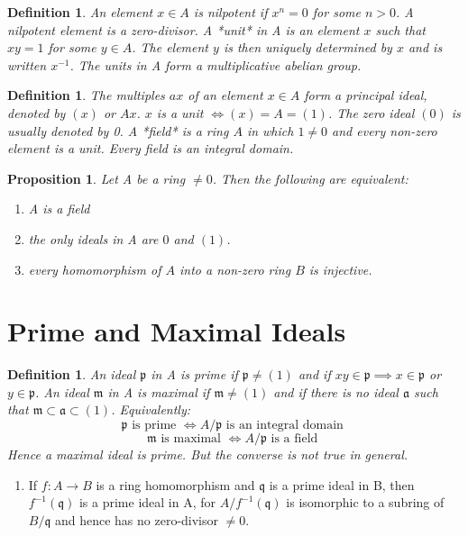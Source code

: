 \documentclass[]{report}
\newtheorem{prop}[theorem]{Proposition}
\newtheorem{defn}[theorem]{Definition}
\begin{document}
\begin{defn}
    An element $x\in A$ is nilpotent if $x^n=0$ for some $n>0$. A nilpotent element is a zero-divisor. A *unit* in A is an element $x$ such that $xy=1$ for some $y\in A$. The element $y$ is then uniquely determined by $x$ and is written $x^{-1}$. The units in A form a multiplicative abelian group.
\end{defn}

\begin{defn}
    The multiples $ax$ of an element $x\in A$ form a principal ideal, denoted by $(x)$ or $Ax$. $x$ is a unit $\Leftrightarrow (x) = A = (1)$. The zero ideal $(0)$ is usually denoted by 0. A *field* is a ring $A$ in which $1\neq 0$ and every non-zero element is a unit. Every field is an integral domain. 
\end{defn}

\begin{prop}
    Let A be a ring $\neq 0$. Then the following are equivalent:
    \begin{enumerate}
        \item A is a field
        \item the only ideals in A are $0$ and $(1)$.
        \item every homomorphism of $A$ into a non-zero ring $B$ is injective.
    \end{enumerate}
\end{prop}

\section{Prime and Maximal Ideals}

\begin{defn}
    An ideal $\mathfrak{p}$ in A is prime if $\mathfrak{p}\neq (1)$ and if $xy\in \mathfrak{p} \implies x \in \mathfrak{p}$ or $y \in \mathfrak{p}$.
An ideal $\mathfrak{m}$ in A is maximal if $\mathfrak{m} \neq (1)$ and if there is no ideal $\mathfrak{a}$ such that $\mathfrak{m\subset a\subset} (1)$. Equivalently:
$$\mathfrak{p} \text{ is prime } \Leftrightarrow A/\mathfrak{p} \text{ is an integral domain }$$
$$\mathfrak{m} \text{ is maximal } \Leftrightarrow A/\mathfrak{p} \text{ is a field }$$
Hence a maximal ideal is prime. But the converse is not true in general. 
\end{defn}

\begin{enumerate} 
    \item If $f: A \rightarrow B$ is a ring homomorphism and $\mathfrak{q}$ is a prime ideal in B, then $f^{-1}(\mathfrak{q})$ is a prime ideal in A, for $A/f^{-1}(\mathfrak{q})$ is isomorphic to a subring of $B/\mathfrak{q}$ and hence has no zero-divisor $\neq 0$. 
\end{enumerate}
\end{document}
